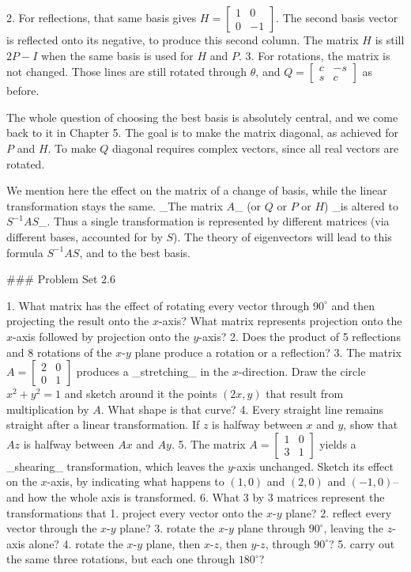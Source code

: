 2. For reflections, that same basis gives \(H=\left[\begin{smallmatrix}1&0\\ 0&-1\end{smallmatrix}\right]\). The second basis vector is reflected onto its negative, to produce this second column. The matrix \(H\) is still \(2P-I\) when the same basis is used for \(H\) and \(P\).
3. For rotations, the matrix is not changed. Those lines are still rotated through \(\theta\), and \(Q=\left[\begin{smallmatrix}c&-s\\ s&c\end{smallmatrix}\right]\) as before.

The whole question of choosing the best basis is absolutely central, and we come back to it in Chapter 5. The goal is to make the matrix diagonal, as achieved for \(P\) and \(H\). To make \(Q\) diagonal requires complex vectors, since all real vectors are rotated.

We mention here the effect on the matrix of a change of basis, while the linear transformation stays the same. _The matrix \(A\)_ (or \(Q\) or \(P\) or \(H\)) _is altered to \(S^{-1}AS\)_. Thus a single transformation is represented by different matrices (via different bases, accounted for by \(S\)). The theory of eigenvectors will lead to this formula \(S^{-1}AS\), and to the best basis.

### Problem Set 2.6

1. What matrix has the effect of rotating every vector through \(90^{\circ}\) and then projecting the result onto the \(x\)-axis? What matrix represents projection onto the \(x\)-axis followed by projection onto the \(y\)-axis?
2. Does the product of 5 reflections and 8 rotations of the \(x\)-\(y\) plane produce a rotation or a reflection?
3. The matrix \(A=\left[\begin{smallmatrix}2&0\\ 0&1\end{smallmatrix}\right]\) produces a _stretching_ in the \(x\)-direction. Draw the circle \(x^{2}+y^{2}=1\) and sketch around it the points \((2x,y)\) that result from multiplication by \(A\). What shape is that curve?
4. Every straight line remains straight after a linear transformation. If \(z\) is halfway between \(x\) and \(y\), show that \(Az\) is halfway between \(Ax\) and \(Ay\).
5. The matrix \(A=\left[\begin{smallmatrix}1&0\\ 3&1\end{smallmatrix}\right]\) yields a _shearing_ transformation, which leaves the \(y\)-axis unchanged. Sketch its effect on the \(x\)-axis, by indicating what happens to \((1,0)\) and \((2,0)\) and \((-1,0)\)--and how the whole axis is transformed.
6. What 3 by 3 matrices represent the transformations that 1. project every vector onto the \(x\)-\(y\) plane? 2. reflect every vector through the \(x\)-\(y\) plane? 3. rotate the \(x\)-\(y\) plane through \(90^{\circ}\), leaving the \(z\)-axis alone? 4. rotate the \(x\)-\(y\) plane, then \(x\)-\(z\), then \(y\)-\(z\), through \(90^{\circ}\)? 5. carry out the same three rotations, but each one through \(180^{\circ}\)? 